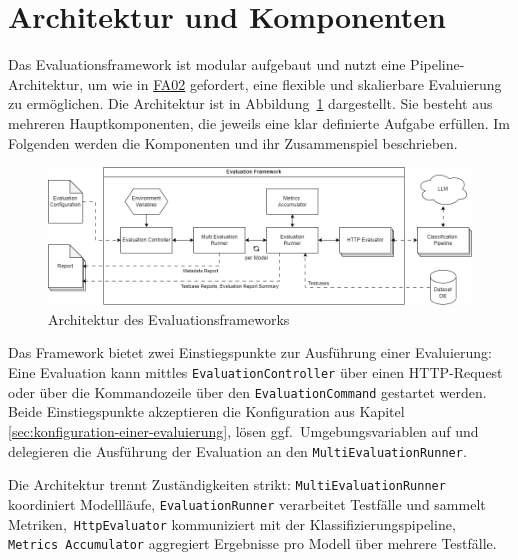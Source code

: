 \section{Architektur und Komponenten}\label{sec:architektur-und-komponenten}

Das Evaluationsframework ist modular aufgebaut und nutzt eine Pipeline-Architektur, um wie in \hyperlink{FA02}{FA02} gefordert, eine flexible und skalierbare Evaluierung zu ermöglichen. Die Architektur ist in Abbildung~\ref{fig:evaluation-framework-architecture} dargestellt. Sie besteht aus mehreren Hauptkomponenten, die jeweils eine klar definierte Aufgabe erfüllen. Im Folgenden werden die Komponenten und ihr Zusammenspiel beschrieben.

\begin{figure}[h]
    \centering
    \includegraphics[width=\linewidth]{images/evaluation/evaluation-framework-architecture.drawio}
    \caption{Architektur des Evaluationsframeworks}
    \label{fig:evaluation-framework-architecture}
\end{figure}

Das Framework bietet zwei Einstiegspunkte zur Ausführung einer Evaluierung: Eine Evaluation kann mittles \texttt{EvaluationController} über einen HTTP-Request oder über die Kommandozeile über den \texttt{EvaluationCommand} gestartet werden. Beide Einstiegspunkte akzeptieren die Konfiguration aus Kapitel \ref{sec:konfiguration-einer-evaluierung}, lösen ggf.\ Umgebungsvariablen auf und delegieren die Ausführung der Evaluation an den \texttt{MultiEvaluationRunner}.

Die Architektur trennt Zuständigkeiten strikt: \texttt{MultiEvaluationRunner} koordiniert Modellläufe, \texttt{EvaluationRunner} verarbeitet Testfälle und sammelt Metriken,\linebreak~\texttt{HttpEvaluator} kommuniziert mit der Klassifizierungspipeline, \texttt{Metrics\linebreak~Accumulator} aggregiert Ergebnisse pro Modell über mehrere Testfälle.